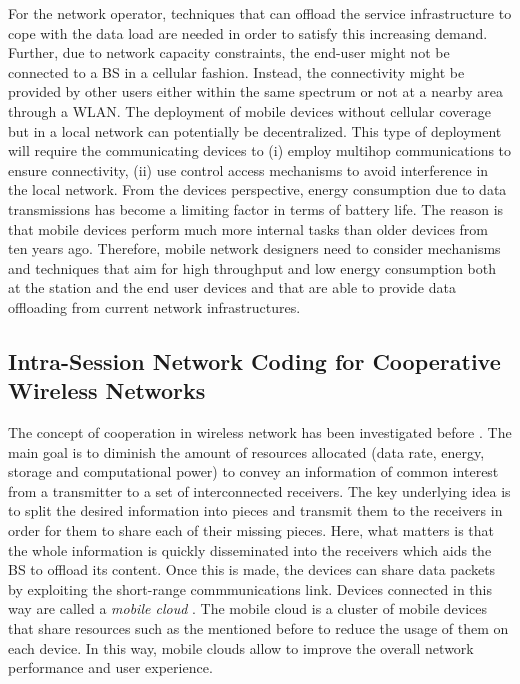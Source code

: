 For the network operator, techniques that can offload the service infrastructure to cope with the data load are needed in order to satisfy this increasing demand. Further, due to network capacity constraints, the end-user might not be connected to a \ac{BS} in a cellular fashion. Instead, the connectivity might be provided by other users either within the same spectrum or not at a nearby area through a \ac{WLAN}. The deployment of mobile devices without cellular coverage but in a local network can potentially be decentralized. This type of deployment will require the communicating devices to (i) employ multihop communications to ensure connectivity, (ii) use control access mechanisms to avoid interference in the local network. From the devices perspective, energy consumption due to data transmissions has become a limiting factor in terms of battery life. The reason is that mobile devices perform much more internal tasks than older devices from ten years ago. Therefore, mobile network designers need to consider mechanisms and techniques that aim for high throughput and low energy consumption both at the station and the end user devices and that are able to provide data offloading from current network infrastructures.

\subsection{Intra-Session Network Coding for Cooperative Wireless Networks}
The concept of cooperation in wireless network has been investigated before \cite{fitzek2006cooperation,fitzek2013mobile}. The main goal is to diminish the amount of resources allocated (data rate, energy, storage and computational power) to convey an information of common interest from a transmitter to a set of interconnected receivers. The key underlying idea is to split the desired information into pieces and transmit them to the receivers in order for them to share each of their missing pieces. Here, what matters is that the whole information is quickly disseminated into the receivers which aids the \ac{BS} to offload its content. Once this is made, the devices can share data packets by exploiting the short-range commmunications link. Devices connected in this way are called a \textit{mobile cloud} \cite{fitzek2013mobile}. The mobile cloud is a cluster of mobile devices that share resources such as the mentioned before to reduce the usage of them on each device. In this way, mobile clouds allow to improve the overall network performance and user experience.


